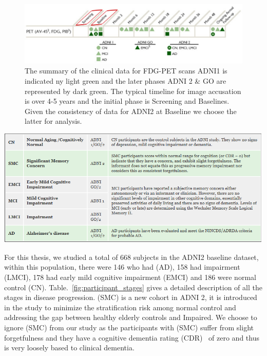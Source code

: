 \begin{figure}
	\centering
	\includegraphics[width=\linewidth]{figures/Imaging_Chart_PET.png}
	\caption[Summary of clinical data and how it is collected.]{The summary of the clinical data for FDG-PET scans ADNI1 is indicated ny light green and the later phases ADNI 2 \& GO are represented by dark green. The typical timeline for image accusation is over 4-5 years and the initial phase is Screening and Baselines. Given the consistency of data for ADNI2 at Baseline we choose the latter for analysis.}
	\label{fig:study_schedule}
\end{figure}
 

\begin{table}
	\centering
	\includegraphics[width=\linewidth]{figures/participant_stages.png}
	\caption[Participant Stages across ADNI 1/GO/2.]{Participant Stages across ADNI 1/GO/2.\footnote{http://adni.loni.usc.edu/study-design/background-rationale/}}
	\label{fig:participant_stages}
\end{table}
  
For this thesis, we studied a total of 668 subjects in the ADNI2 baseline dataset, within this population, there were 146 who had \Alzheimers (AD), 158 had impairment (LMCI), 178 had early mild cognitive impairment (EMCI) and 186 were normal control (CN). Table.~\ref{fig:participant_stages} gives a detailed description of all the stages in disease progression. (SMC) is a new cohort in ADNI 2, it is introduced in the study to minimize the stratification risk among normal control and addressing the gap between healthy elderly controls and Impaired. We choose to ignore (SMC) from our study as the participants with (SMC) suffer from slight forgetfulness and they have a cognitive dementia rating (CDR)~\citep{morris1993clinical} of zero and thus is very loosely based to clinical dementia. 

